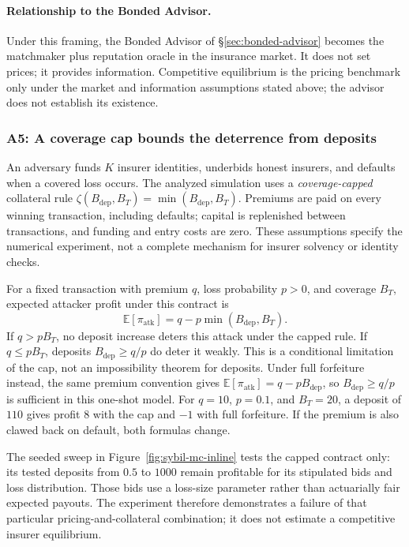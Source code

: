 \documentclass[11pt,a4paper]{article}
\theoremstyle{definition}
\theoremstyle{remark}
\begin{document}


\paragraph{Relationship to the Bonded Advisor.}
Under this framing, the Bonded Advisor of \S\ref{sec:bonded-advisor} becomes the matchmaker plus reputation oracle in the insurance market. It does not set prices; it provides information. Competitive equilibrium is the pricing benchmark only under the market
and information assumptions stated above; the advisor does not establish
its existence.

\subsubsection{A5: A coverage cap bounds the deterrence from deposits}\label{sec:youle:a5}

An adversary funds $K$ insurer identities, underbids honest insurers, and
defaults when a covered loss occurs. The analyzed simulation uses a
\emph{coverage-capped} collateral rule
$\zeta(B_{\mathrm{dep}},B_T)=\min(B_{\mathrm{dep}},B_T)$.
Premiums are paid on every winning transaction, including defaults; capital
is replenished between transactions, and funding and entry costs are zero.
These assumptions specify the numerical experiment, not a complete
mechanism for insurer solvency or identity checks.



For a fixed transaction with premium $q$, loss probability $p>0$, and
coverage $B_T$, expected attacker profit under this contract is
\[
\mathbb E[\pi_{\mathrm{atk}}]=q-p\min(B_{\mathrm{dep}},B_T).
\]
If $q>pB_T$, no deposit increase deters this attack under the capped rule.
If $q\le pB_T$, deposits $B_{\mathrm{dep}}\ge q/p$ do deter it weakly.
This is a conditional limitation of the cap, not an impossibility theorem
for deposits. Under full forfeiture instead, the same premium convention
gives $\mathbb E[\pi_{\mathrm{atk}}]=q-pB_{\mathrm{dep}}$, so $B_{\mathrm{dep}}\ge q/p$
is sufficient in this one-shot model. For $q=10$, $p=0.1$, and $B_T=20$,
a deposit of $110$ gives profit $8$ with the cap and $-1$ with full forfeiture.
If the premium is also clawed back on default, both formulas change.

The seeded sweep in Figure~\ref{fig:sybil-mc-inline} tests the capped
contract only: its tested deposits from $0.5$ to $1000$ remain profitable
for its stipulated bids and loss distribution. Those bids use a loss-size
parameter rather than actuarially fair expected payouts. The experiment
therefore demonstrates a failure of that particular pricing-and-collateral
combination; it does not estimate a competitive insurer equilibrium.
\end{document}
